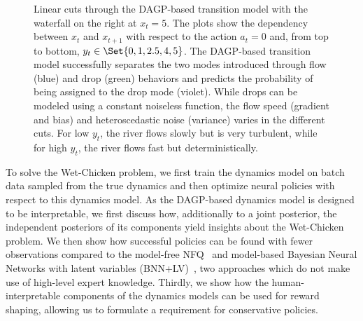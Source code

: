 \begin{figure}[tp]
    \centering
    
    
    
    
    
    \vspace*{-9pt} %
    \caption[Linear cuts through a wet-chicken dynamics model]{
        \label{fig:interpretable_rl:wetchicken:cut}
        Linear cuts through the DAGP-based transition model with the waterfall on the right at $x_t = 5$.
        The plots show the dependency between $x_t$ and $x_{t+1}$ with respect to the action $a_t = 0$ and, from top to bottom, $y_t \in \Set{0, 1, 2.5, 4, 5}$.
        The DAGP-based transition model successfully separates the two modes introduced through flow (blue) and drop (green) behaviors and predicts the probability of being assigned to the drop mode (violet).
        While drops can be modeled using a constant noiseless function, the flow speed (gradient and bias) and heteroscedastic noise (variance) varies in the different cuts.
        For low $y_t$, the river flows slowly but is very turbulent, while for high $y_t$, the river flows fast but deterministically.
    }
\end{figure}
To solve the Wet-Chicken problem, we first train the dynamics model on batch data sampled from the true dynamics and then optimize neural policies with respect to this dynamics model.
As the DAGP-based dynamics model is designed to be interpretable, we first discuss how, additionally to a joint posterior, the independent posteriors of its components yield insights about the Wet-Chicken problem.
We then show how successful policies can be found with fewer observations compared to the model-free NFQ~\parencite{riedmiller_neural_2005} and model-based Bayesian Neural Networks with latent variables (BNN+LV)~\parencite{depeweg_learning_2016}, two approaches which do not make use of high-level expert knowledge.
Thirdly, we show how the human-interpretable components of the dynamics models can be used for reward shaping, allowing us to formulate a requirement for conservative policies.


